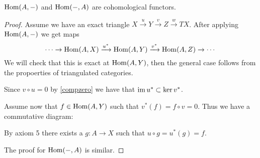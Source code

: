 \documentclass[a4paper, UKenglish]{report}
\begin{document}
\begin{lemma}
$\operatorname{Hom}(A,-)$ and $\operatorname{Hom}(-,A)$ are cohomological functors.
\end{lemma}
\begin{proof}
Assume we have an exact triangle $X \xrightarrow{u} Y \xrightarrow{v} Z \xrightarrow{w} TX$. After applying $\operatorname{Hom}(A,-)$ we get maps
\[ \cdots \to \operatorname{Hom}(A,X) \xrightarrow{u^\ast} \operatorname{Hom}(A,Y) \xrightarrow{v^\ast} \operatorname{Hom}(A,Z) \to \cdots \]
We will check that this is exact at $\operatorname{Hom}(A,Y)$, then the general case follows from the propoerties of triangulated categories.

Since $v \circ u = 0$ by \ref{compzero} we have that $\operatorname{im} u^\ast \subset \ker v^\ast$.

Assume now that $f \in \operatorname{Hom}(A,Y)$ such that $v^\ast(f) = f \circ v = 0$. Thus we have a commutative diagram:


By axiom 5 there exists a $g: A \to X$ such that $u \circ g = u^\ast (g) = f$. 

The proof for $\operatorname{Hom}(-,A)$ is similar.
\end{proof}

\clearpage
\printbibliography
\end{document}
